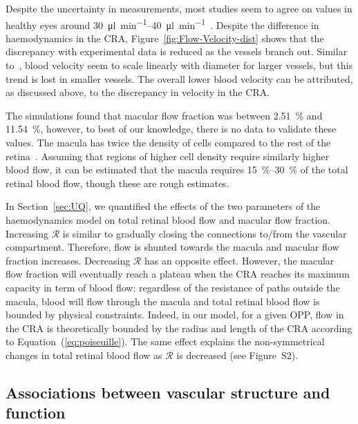 \documentclass[11pt,]{article}
\begin{document}
Despite the uncertainty in measurements, most studies seem to agree on values in healthy eyes around \SIrange{30}{40}{\micro\litre\per\minute}~\cite{DoblhoffDier2014,Riva1985}.
Despite the difference in haemodynamics in the CRA, Figure~\ref{fig:Flow-Velocity-dist} shows that the discrepancy with experimental data is reduced as the vessels branch out.
Similar to~\cite{DoblhoffDier2014}, blood velocity seem to scale linearly with diameter for larger vessels, but this trend is lost in smaller vessels.
The overall lower blood velocity can be attributed, as discussed above, to the discrepancy in velocity in the CRA.

The simulations found that macular flow fraction was between \SI{2.51}{\percent} and \SI{11.54}{\percent}, however, to best of our knowledge, there is no data to validate these values.
The macula has twice the density of cells compared to the rest of the retina~\cite{Zouache2022}.
Assuming that regions of higher cell density require similarly higher blood flow, it can be estimated that the macula requires \SIrange{15}{30}{\percent} of the total retinal blood flow, though these are rough estimates.

In Section~\ref{sec:UQ}, we quantified the effects of the two parameters of the haemodynamics model on total retinal blood flow and macular flow fraction.
Increasing $\mathcal R$ is similar to gradually closing the connections to/from the vascular compartment.
Therefore, flow is shunted towards the macula and macular flow fraction increases.
Decreasing $\mathcal R$ has an opposite effect. However, the macular flow fraction will eventually reach a plateau when the CRA reaches its maximum capacity in term of blood flow: regardless of the resistance of paths outside the macula, blood will flow through the macula and total retinal blood flow is bounded by physical constraints.
Indeed, in our model, for a given OPP, flow in the CRA is theoretically bounded by the radius and length of the CRA according to Equation~(\ref{eq:poiseuille}).
The same effect explains the non-symmetrical changes in total retinal blood flow as $\mathcal R$ is decreased (see Figure~S2). %

\subsection{Associations between vascular structure and function}\label{sec:disc-results}
\end{document}
